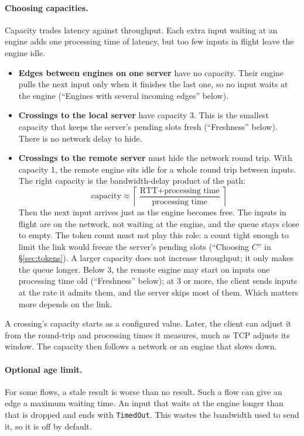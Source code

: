 \documentclass[11pt]{article}
\newcommand{\code}[1]{\texttt{#1}}
\begin{document}
\paragraph{Choosing capacities.} Capacity trades latency against throughput.
Each extra input waiting at an engine adds one processing time of latency,
but too few inputs in flight leave the engine idle.
\begin{itemize}[nosep]
  \item \textbf{Edges between engines on one server} have no capacity. Their
        engine pulls the next input only when it finishes the last one, so no
        input waits at the engine (``Engines with several incoming edges''
        below).
  \item \textbf{Crossings to the local server} have capacity 3. This is the
        smallest capacity that keeps the server's pending slots fresh
        (``Freshness'' below). There is no network delay to hide.
  \item \textbf{Crossings to the remote server} must hide the network round
        trip. With capacity 1, the remote engine sits idle for a whole round
        trip between inputs. The right capacity is the bandwidth-delay
        product of the path:
        \[
          \text{capacity} \approx \left\lceil
          \frac{\text{RTT} + \text{processing time}}{\text{processing time}}
          \right\rceil
        \]
        Then the next input arrives just as the engine becomes free. The
        inputs in flight are on the network, not waiting at the engine, and
        the queue stays close to empty. The token count must not play this
        role: a count tight enough to limit the link would freeze the
        server's pending slots (``Choosing $C$'' in \S\ref{sec:tokens}). A
        larger capacity does not increase throughput; it only
        makes the queue longer. Below 3, the remote engine may start on
        inputs one processing time old (``Freshness'' below); at 3 or more,
        the client sends inputs at the rate it admits them, and the server
        skips most of them. Which matters more depends on the link.
\end{itemize}
A crossing's capacity starts as a configured value. Later, the client can
adjust it from the round-trip and processing times it measures, much as TCP
adjusts its window. The capacity then follows a network or an engine that
slows down.

\paragraph{Optional age limit.} For some flows, a stale result is worse than
no result. Such a flow can give an edge a maximum waiting time. An input that
waits at the engine longer than that is dropped and ends with
\code{TimedOut}. This wastes the bandwidth used to send it, so it is off by
default.
\end{document}
